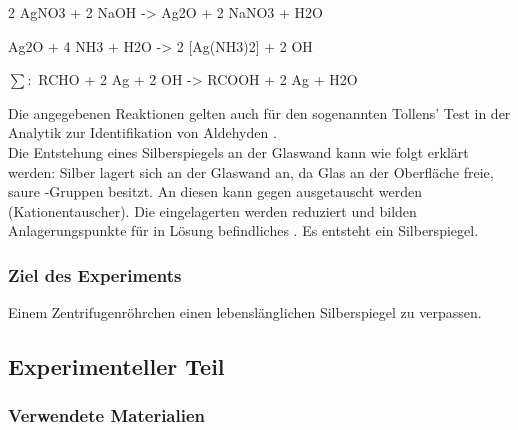 \documentclass{article}
\begin{document}
        \begin{reaction}
          2 AgNO3\aq{} + 2 NaOH\aq{} -> Ag2O\sld{} + 2 NaNO3\aq{} + H2O\\
        \end{reaction}
        
        \begin{reaction}
          Ag2O\sld{} + 4 NH3\sld{} + H2O -> 2 [Ag(NH3)2]\pch\aq{} + 2 OH\mch\aq \\
        \end{reaction}
        
        \begin{reactions}
          $\sum :$ RCHO\aq{} + 2 Ag\pch\aq{} + 2 OH\mch\aq{} -> RCOOH\aq{} + 2 Ag\sld{} + H2O
        \end{reactions} 
        
        Die angegebenen Reaktionen gelten auch für den sogenannten Tollens' Test in der Analytik zur Identifikation von Aldehyden \cite{Tollenstest}. \\
        
        Die Entstehung eines Silberspiegels an der Glaswand kann wie folgt erklärt werden: Silber lagert sich an der Glaswand an, da Glas an der Oberfläche freie, saure -Gruppen besitzt. An diesen kann  gegen  ausgetauscht werden (Kationentauscher). Die eingelagerten  werden reduziert und bilden Anlagerungspunkte für in Lösung befindliches .  Es entsteht ein Silberspiegel.
      
      \subsubsection{Ziel des Experiments}
      
        Einem Zentrifugenröhrchen einen lebenslänglichen Silberspiegel zu verpassen.
    
    \subsection{Experimenteller Teil}
    
      \subsubsection{Verwendete Materialien}
        
\end{document}
